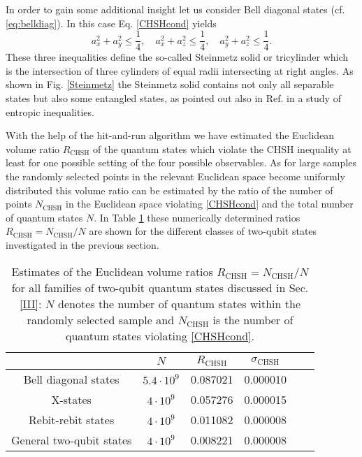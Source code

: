 \documentclass[12pt]{iopart}
\begin{document}
In order to gain some additional insight let us consider Bell diagonal states (cf.  \eqref{eq:belldiag}). In this case Eq. \eqref{CHSHcond} yields
\begin{equation}\label{eq:Steinmetz}
 a^2_x+a^2_y \leqslant \frac{1}{4}, \quad  a^2_x+a^2_z \leqslant \frac{1}{4}, \quad  a^2_y+a^2_z \leqslant \frac{1}{4}.
\end{equation}
These three inequalities define the so-called Steinmetz solid or tricylinder which is the intersection of three cylinders of equal radii intersecting at right angles. 
As shown in Fig. \ref{Steinmetz} the Steinmetz solid 
contains not only all separable states but also some entangled states, as pointed out also in Ref. \cite{Alves} in a study of entropic inequalities.


With the help of the hit-and-run algorithm we have estimated the Euclidean volume ratio $R_{\text{CHSH}}$ of the quantum states which violate the CHSH inequality at least for one possible setting of the four 
possible observables. 
As for large samples the randomly selected points in the relevant Euclidean space become uniformly distributed this volume ratio can be estimated by the ratio of the number of points $N_{\text{CHSH}}$ in the 
Euclidean space  violating \eqref{CHSHcond} and the
total number of quantum states $N$.
In Table \ref{tab:qbqbCHSH} these
numerically determined ratios $R_{\text{CHSH}}=N_{\text{CHSH}}/N$ are shown for the different classes of two-qubit states investigated in the previous section.

\begin{table}[H]
  \centering
\begin{tabular}{|c|c|c|c|c|c|}
\hline
 & $N$  & $R_{\text{CHSH}}$ & $\sigma_{\text{CHSH}}$ \\
\hline
Bell diagonal states & $5.4 \cdot 10^9$ &  0.087021 &  0.000010\\
\hline
X-states & $4\cdot 10^9$ &  0.057276 & 0.000015 \\
\hline
Rebit-rebit states & $4\cdot 10^9$ & 0.011082 & 0.000008   \\
\hline
General two-qubit states& $4\cdot 10^9$ & 0.008221 & 0.000008 \\
\hline
\end{tabular}
\caption{
Estimates of the Euclidean volume ratios $R_{\text{CHSH}}=N_{\text{CHSH}}/N$ for all families of two-qubit quantum states discussed in Sec. \ref{III}: $N$ denotes the number of quantum states within the randomly 
selected sample and $N_{\text{CHSH}}$ is
the number of quantum states violating \eqref{CHSHcond}.}
\label{tab:qbqbCHSH}
\end{table}
\end{document}
